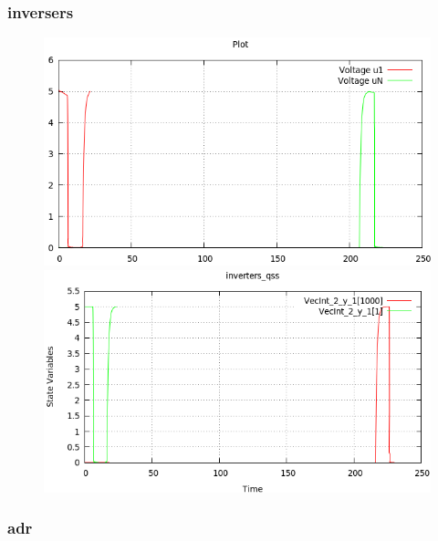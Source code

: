 \documentclass[a4paper,	11pt]{report}
\begin{document}
\subsubsection{inversers}

\begin{figure}[H]
\centering
\begin{minipage}{0.5\textwidth}
\centering
 \includegraphics[width=\linewidth]{inversers-pd}
\end{minipage}\hfill
\begin{minipage}{0.5\textwidth}
\centering
 \includegraphics[width=\linewidth]{inversers-qss}
\end{minipage}
\end{figure}

\subsubsection{adr}
\end{document}
